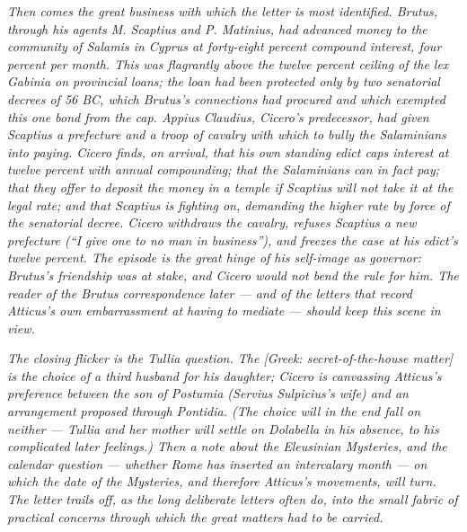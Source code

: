 \textit{Then comes the great business with which the
letter is most identified. Brutus, through his agents
M. Scaptius and P. Matinius, had advanced money to the
community of Salamis in Cyprus at forty-eight percent
compound interest, four percent per month. This was
flagrantly above the twelve percent ceiling of the
\textit{lex Gabinia} on provincial loans; the loan had
been protected only by two senatorial decrees of 56 BC,
which Brutus's connections had procured and which
exempted this one bond from the cap. Appius Claudius,
Cicero's predecessor, had given Scaptius a prefecture
and a troop of cavalry with which to bully the
Salaminians into paying. Cicero finds, on arrival, that
his own standing edict caps interest at twelve percent
with annual compounding; that the Salaminians can in
fact pay; that they offer to deposit the money in a
temple if Scaptius will not take it at the legal rate;
and that Scaptius is fighting on, demanding the higher
rate by force of the senatorial decree. Cicero withdraws
the cavalry, refuses Scaptius a new prefecture (``I give
one to no man in business''), and freezes the case at
his edict's twelve percent. The episode is the great
hinge of his self-image as governor: Brutus's
friendship was at stake, and Cicero would not bend the
rule for him. The reader of the Brutus correspondence
later --- and of the letters that record Atticus's own
embarrassment at having to mediate --- should keep this
scene in view.}

\textit{The closing flicker is the Tullia question. The
\textit{[Greek: secret-of-the-house matter]} is the
choice of a third husband for his daughter; Cicero is
canvassing Atticus's preference between the son of
Postumia (Servius Sulpicius's wife) and an arrangement
proposed through Pontidia. (The choice will in the end
fall on neither --- Tullia and her mother will settle
on Dolabella in his absence, to his complicated
later feelings.) Then a note about the Eleusinian
Mysteries, and the calendar question --- whether Rome
has inserted an intercalary month --- on which the date
of the Mysteries, and therefore Atticus's movements,
will turn. The letter trails off, as the long
deliberate letters often do, into the small fabric of
practical concerns through which the great matters had
to be carried.}
